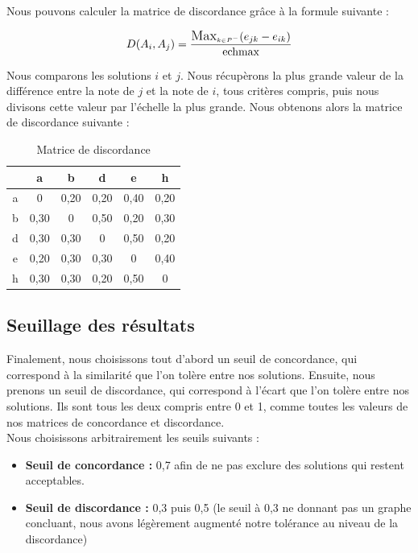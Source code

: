 \documentclass[paper=a4, fontsize=11pt]{report}
\numberwithin{equation}{section}		%
\numberwithin{figure}{section}			%
\numberwithin{table}{section}				%
\renewcommand{\bf}[1]{\textbf{#1}}
\begin{document}
Nous pouvons calculer la matrice de discordance grâce à la formule suivante :

\begin{equation*}
D(A_i, A_j) = \frac{\mathlarger{\mathlarger{\text{Max}}}_{\mathsmaller{k \in P^- }} (e_{jk} - e_{ik})}{\text{echmax}}
\end{equation*} 

Nous comparons les solutions $i$ et $j$. Nous récupèrons la plus grande valeur de la différence entre la note de $j$ et la note de $i$, tous critères compris, puis nous divisons cette valeur par l’échelle la plus grande. Nous obtenons alors la matrice de discordance suivante : \\

\begin{table}[H]
\begin{center}
\begin{tabular}{c|ccccc}
 & a & b & d & e & h \\ 
\hline 
a & 0 & 0,20	 & 0,20 & 0,40 & 0,20 \\ 
b & 0,30 & 0	& 0,50 & 0,20 &	0,30 \\ 
d & 0,30 & 0,30 & 0 & 0,50 &	0,20 \\ 
e & 0,20 & 0,30 & 0,30 & 0 & 0,40 \\ 
h & 0,30 & 0,30 & 0,20 &	0,50 & 0\\ 
\end{tabular} 
\caption{Matrice de discordance} 
\end{center}
\end{table}

\subsection{Seuillage des résultats}

Finalement, nous choisissons tout d’abord un seuil de concordance, qui correspond à la similarité que l’on tolère entre nos solutions. Ensuite, nous prenons un seuil de discordance, qui correspond à l’écart que l’on tolère entre nos solutions. Ils sont tous les deux compris entre 0 et 1, comme toutes les valeurs de nos matrices de concordance et discordance.\\

Nous choisissons arbitrairement les seuils suivants : \\

\begin{itemize}
\item \bf{Seuil de concordance :} 0,7 afin de ne pas exclure des solutions qui restent acceptables.
\item \bf{Seuil de discordance :} 0,3 puis 0,5 (le seuil à 0,3 ne donnant pas un graphe concluant, nous avons légèrement augmenté notre tolérance au niveau de la discordance)
\end{itemize}
\end{document}
